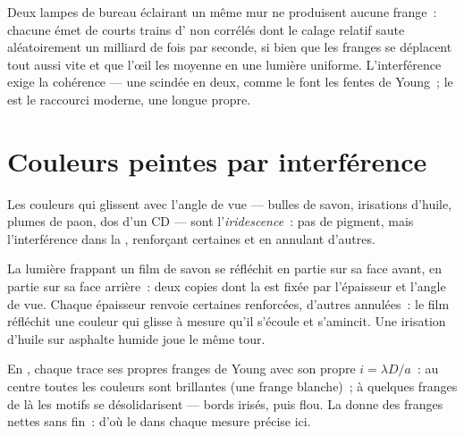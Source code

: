 \begin{remark}\label{rem:g12:light-as-wave:lamps}
Deux lampes de bureau éclairant un même mur ne produisent aucune
frange~: chacune émet de courts trains d' non corrélés dont
le calage relatif saute aléatoirement un milliard de fois par seconde,
si bien que les franges se déplacent tout aussi vite et que l'œil les
moyenne en une lumière uniforme. L'interférence exige la
cohérence --- une  scindée en deux, comme le
font les fentes de Young~; le  est le raccourci moderne,
une longue  propre.
\end{remark}

\section{Couleurs peintes par interférence}

\begin{definition}[Iridescence]\label{def:g12:light-as-wave:iridescence}
Les couleurs qui glissent avec l'angle de vue --- bulles de savon,
irisations d'huile, plumes de paon, dos d'un CD --- sont
l'\emph{iridescence}~: pas de pigment, mais
l'interférence dans la , renforçant certaines
 et en annulant d'autres.
\end{definition}

\begin{example}\label{ex:g12:light-as-wave:soap}
La lumière frappant un film de savon se réfléchit en partie sur sa
face avant, en partie sur sa face arrière~: deux copies
 dont la  est
fixée par l'épaisseur et l'angle de vue. Chaque épaisseur renvoie
certaines  renforcées, d'autres annulées~: le
film réfléchit une couleur qui glisse à mesure qu'il s'écoule et
s'amincit. Une irisation d'huile sur asphalte humide joue le même
tour.
\end{example}

\begin{remark}\label{rem:g12:light-as-wave:white}
En , chaque  trace ses
propres franges de Young avec son propre $i = \lambda D/a$~: au centre
toutes les couleurs sont brillantes (une frange blanche)~; à quelques
franges de là les motifs se désolidarisent --- bords irisés, puis
flou. La  donne des franges nettes sans
fin~: d'où le  dans chaque mesure précise ici.
\end{remark}

